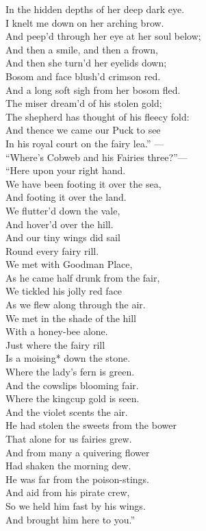 \documentclass[
  12pt,
  a5paper,
  twoside]{book}
\begin{document}
In the hidden depths of her deep dark eye.\\
I knelt me down on her arching brow.\\
And peep'd through her eye at her soul below;\\
And then a smile, and then a frown,\\
And then she turn'd her eyelids down;\\
Bosom and face blush'd crimson red.\\
And a long soft sigh from her bosom fled.\\
The miser dream'd of his stolen gold;\\
The shepherd has thought of his fleecy fold:\\
And thence we came our Puck to see\\
In his royal court on the fairy lea.'' ---\\
``Where's Cobweb and his Fairies three?''---\\
``Here upon your right hand.\\
We have been footing it over the sea,\\
And footing it over the land.\\
We flutter'd down the vale,\\
And hover'd over the hill.\\
And our tiny wings did sail\\
Round every fairy rill.\\
We met with Goodman Place,\\
As he came half drunk from the fair,\\
We tickled his jolly red face\\
As we flew along through the air.\\
We met in the shade of the hill\\
With a honey-bee alone.\\
Just where the fairy rill\\
Is a moising* down the stone.\\
Where the lady's fern is green.\\
And the cowslips blooming fair.\\
Where the kingcup gold is seen.\\
And the violet scents the air.\\
He had stolen the sweets from the bower\\
That alone for us fairies grew.\\
And from many a quivering flower\\
Had shaken the morning dew.\\
He was far from the poison-stings.\\
And aid from his pirate crew,\\
So we held him fast by his wings.\\
And brought him here to you.''
\end{document}

